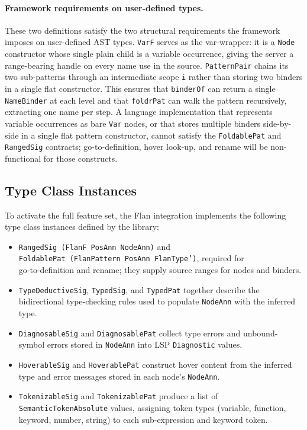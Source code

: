 \paragraph{Framework requirements on user-defined types.}
These two definitions satisfy the two structural requirements the framework imposes on user-defined AST types.
\texttt{VarF} serves as the var-wrapper: it is a \texttt{Node} constructor whose single plain child is a variable occurrence, giving the server a range-bearing handle on every name use in the source.
\texttt{PatternPair} chains its two sub-patterns through an intermediate scope \texttt{i} rather than storing two binders in a single flat constructor.
This ensures that \texttt{binderOf} can return a single \texttt{NameBinder} at each level and that \texttt{foldrPat} can walk the pattern recursively, extracting one name per step.
A language implementation that represents variable occurrences as bare \texttt{Var} nodes, or that stores multiple binders side-by-side in a single flat pattern constructor, cannot satisfy the \texttt{FoldablePat} and \texttt{RangedSig} contracts; go-to-definition, hover look-up, and rename will be non-functional for those constructs.

\subsection{Type Class Instances}

To activate the full feature set, the Flan integration implements the following type class instances defined by the library:

\begin{itemize}
\item \texttt{RangedSig (FlanF PosAnn NodeAnn)} and\\
\texttt{FoldablePat (FlanPattern PosAnn FlanType')}, required for\\
go-to-definition and rename; they supply source ranges for nodes and binders.
\item \texttt{TypeDeductiveSig}, \texttt{TypedSig}, and \texttt{TypedPat} together describe the bidirectional type-checking rules used to populate \texttt{NodeAnn} with the inferred type.
\item \texttt{DiagnosableSig} and \texttt{DiagnosablePat} collect type errors and unbound-symbol errors stored in \texttt{NodeAnn} into LSP \texttt{Diagnostic} values.
\item \texttt{HoverableSig} and \texttt{HoverablePat} construct hover content from the inferred type and error messages stored in each node's \texttt{NodeAnn}.
\item \texttt{TokenizableSig} and \texttt{TokenizablePat} produce a list of \texttt{SemanticTokenAbsolute} values, assigning token types (variable, function, keyword, number, string) to each sub-expression and keyword token.
\end{itemize}

